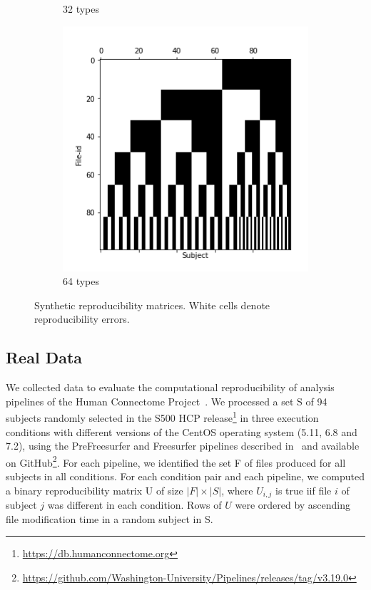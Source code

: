 \documentclass[10pt, conference, compsocconf]{IEEEtran}
\begin{document}
\begin{figure}
\begin{subfigure}[b]{0.45\columnwidth}
                  \caption{32 types}
        \end{subfigure}
                \begin{subfigure}[b]{0.45\columnwidth}
                  \includegraphics[width=\columnwidth]{data/Utility_Matrix/Synthetic/synthetic_subject_types/64_SubjectType_utility_matrix.png}
                  \caption{64 types}
        \end{subfigure}
\caption{Synthetic reproducibility matrices. White cells denote reproducibility errors.}
\label{fig:synthetic-data}
\end{figure}

\subsection{Real Data}

We collected data to evaluate the computational reproducibility of analysis
pipelines of the Human Connectome Project~\cite{glasser2013minimal}. We
processed a set S of 94 subjects randomly selected in the S500 HCP
release\footnote{\url{https://db.humanconnectome.org}} in three execution conditions with different
versions of the CentOS operating system (5.11, 6.8 and 7.2), using the
PreFreesurfer and Freesurfer pipelines described 
in~\cite{glasser2013minimal} and available on 
GitHub\footnote{\url{https://github.com/Washington-University/Pipelines/releases/tag/v3.19.0}}. 
For each pipeline, we identified the set F of files produced for all
subjects in all conditions. For each condition pair and each pipeline, 
we computed a binary reproducibility matrix U of size $|F|\times|S|$, 
where $U_{i,j}$ is true iif file $i$ of subject $j$ was different in 
each condition. Rows of $U$ were ordered by ascending file modification 
time in a random subject in S.
\end{document}

